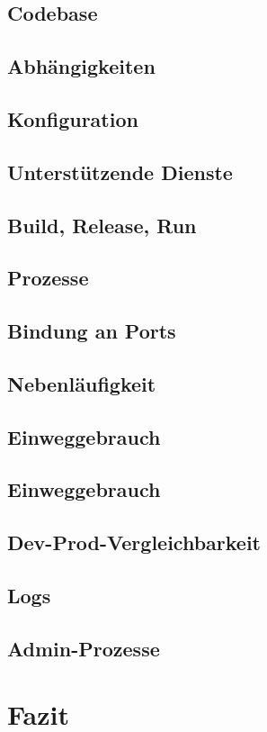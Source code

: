 \documentclass{beamer}
\begin{document}
			\subsection{Codebase}
			\subsection{Abhängigkeiten}
			\subsection{Konfiguration}
			\subsection{Unterstützende Dienste}
			\subsection{Build, Release, Run}
			\subsection{Prozesse}
			\subsection{Bindung an Ports}
			\subsection{Nebenläufigkeit}
			\subsection{Einweggebrauch}
			\subsection{Einweggebrauch}
			\subsection{Dev-Prod-Vergleichbarkeit}
			\subsection{Logs}
			\subsection{Admin-Prozesse}
		\section{Fazit}
\end{document}
